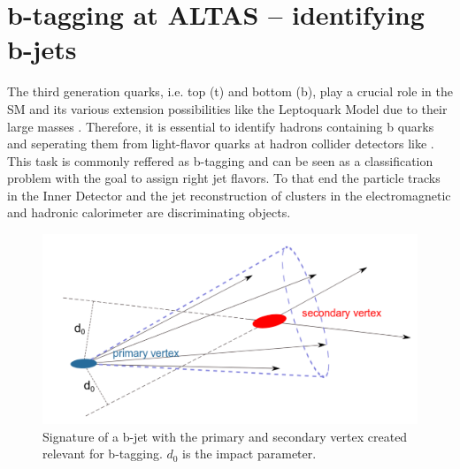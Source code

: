 \section{b-tagging at ALTAS -- identifying b-jets}\label{btagging}
The third generation quarks, i.e. top (t) and bottom (b), play a crucial role in the SM and its various extension possibilities like the Leptoquark Model due to their large masses \cite{Hansson}. Therefore, it is essential to identify hadrons containing b quarks and seperating them from light-flavor quarks at hadron collider detectors like {\ATLAS}. This task is commonly reffered as b-tagging and can be seen as a classification problem with the goal to assign right jet flavors. To that end the particle tracks in the Inner Detector and the jet reconstruction of clusters in the electromagnetic and hadronic calorimeter are discriminating objects. \cite{Paganini}\par
%
\begin{figure}[htbp]                                 
 \begin{center}                                       
  \includegraphics[width=0.55\linewidth]{figures/btagged.pdf} 
   \caption[Tracks in a b-jet.]{Signature of a b-jet with the primary and secondary vertex created relevant for b-tagging. $d_0$ is the impact parameter. \cite{Hansson}}
  \label{btagged}                                    
 \end{center}
\end{figure}
%
